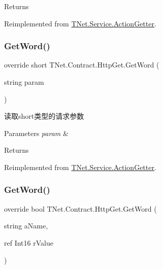 \begin{DoxyReturn}{Returns}

\end{DoxyReturn}


Reimplemented from \mbox{\hyperlink{class_t_net_1_1_service_1_1_action_getter_acb84776850a854df5baeefa4738da0c8}{T\+Net.\+Service.\+Action\+Getter}}.

\mbox{\label{class_t_net_1_1_contract_1_1_http_get_a0b7f40b6bb3468dbd02512645538a12e}} 
\subsubsection{\texorpdfstring{Get\+Word()}{GetWord()}\hspace{0.1cm}{\footnotesize\ttfamily [1/5]}}
{\footnotesize\ttfamily override short T\+Net.\+Contract.\+Http\+Get.\+Get\+Word (\begin{DoxyParamCaption}\item[{string}]{param }\end{DoxyParamCaption})\hspace{0.3cm}{\ttfamily [virtual]}}



读取short类型的请求参数 


\begin{DoxyParams}{Parameters}
{\em param} & \\
\hline
\end{DoxyParams}
\begin{DoxyReturn}{Returns}

\end{DoxyReturn}


Reimplemented from \mbox{\hyperlink{class_t_net_1_1_service_1_1_action_getter_a38f3f98294b26f2d4b4a281db0550e52}{T\+Net.\+Service.\+Action\+Getter}}.

\mbox{\label{class_t_net_1_1_contract_1_1_http_get_a6f010b795d8a3915c1a22671ea0d9cf4}} 
\subsubsection{\texorpdfstring{Get\+Word()}{GetWord()}\hspace{0.1cm}{\footnotesize\ttfamily [2/5]}}
{\footnotesize\ttfamily override bool T\+Net.\+Contract.\+Http\+Get.\+Get\+Word (\begin{DoxyParamCaption}\item[{string}]{a\+Name,  }\item[{ref Int16}]{r\+Value }\end{DoxyParamCaption})\hspace{0.3cm}{\ttfamily [virtual]}}




